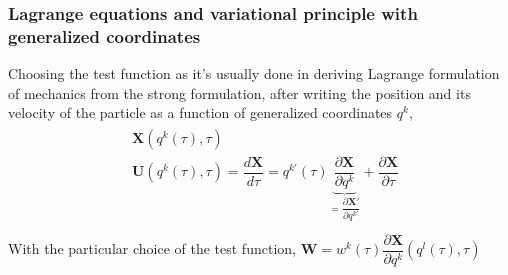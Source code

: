 \documentclass[letterpaper,10pt,english]{jupyterBook}
\begin{document}
\subsubsection*{Lagrange equations and variational principle with generalized coordinates}

\sphinxAtStartPar
Choosing the test function as it’s usually done in deriving Lagrange formulation of mechanics from the strong formulation, after writing the position and its velocity of the particle as a function of generalized coordinates \(q^k\),
\begin{equation*}
\begin{split}\begin{aligned}
  & \mathbf{X}\left(q^k(\tau), \tau \right) \\
  & \mathbf{U}\left(q^k(\tau), \tau \right) = \dfrac{d \mathbf{X}}{d \tau} = q^{k'}(\tau) \underbrace{\dfrac{\partial \mathbf{X}}{\partial q^k}}_{= \dfrac{\partial \mathbf{X}'}{\partial q^{k'}}} + \dfrac{\partial \mathbf{X}}{\partial \tau} \\
\end{aligned}\end{split}
\end{equation*}
\sphinxAtStartPar
With the particular choice of the test function, \(\mathbf{W} = w^k(\tau) \dfrac{\partial \mathbf{X}}{\partial q^k}(q^l(\tau),\tau)\)
\end{document}
